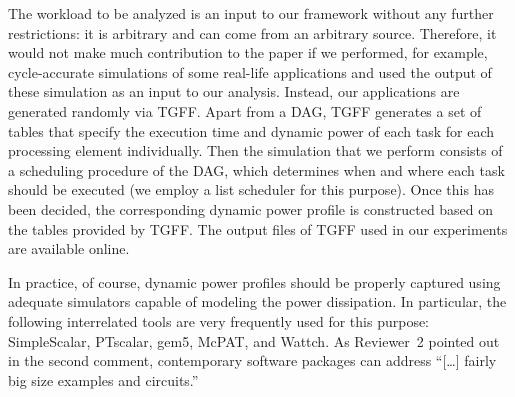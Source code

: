 \begin{authors}
The workload to be analyzed is an input to our framework without any further restrictions: it is arbitrary and can come from an arbitrary source.
Therefore, it would not make much contribution to the paper if we performed, for example, cycle-accurate simulations of some real-life applications and used the output of these simulation as an input to our analysis.
Instead, our applications are generated randomly via TGFF.
Apart from a DAG, TGFF generates a set of tables that specify the execution time and dynamic power of each task for each processing element individually.
Then the simulation that we perform consists of a scheduling procedure of the DAG, which determines when and where each task should be executed (we employ a list scheduler for this purpose).
Once this has been decided, the corresponding dynamic power profile is constructed based on the tables provided by TGFF.
The output files of TGFF used in our experiments are available online.

In practice, of course, dynamic power profiles should be properly captured using adequate simulators capable of modeling the power dissipation.
In particular, the following interrelated tools are very frequently used for this purpose: SimpleScalar, PTscalar, gem5, McPAT, and Wattch.
As Reviewer~2 pointed out in the second comment, contemporary software packages can address ``[\ldots] fairly big size examples and circuits.''


\end{authors}

